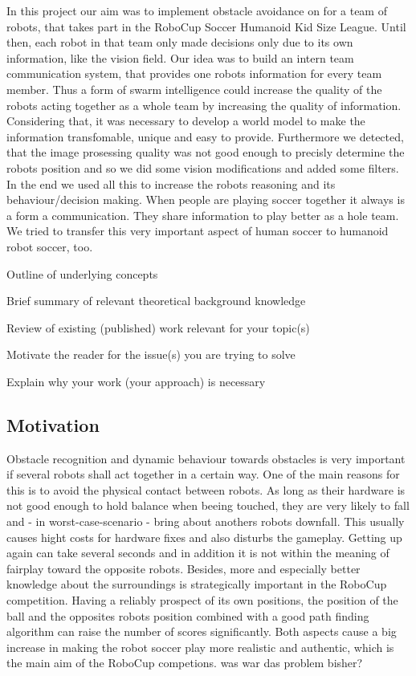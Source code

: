 \documentclass[lnicst,a4paper]{svmultln}
\begin{document}
 
In this project our aim was to implement obstacle avoidance on for a team of robots, that takes part in the RoboCup Soccer Humanoid Kid Size League. Until then, each robot in that team only made decisions only due to its own information, like the vision field. Our idea was to build an intern team communication system, that provides one robots information for every team member. Thus a form of swarm intelligence could increase the quality of the robots acting together as a whole team by increasing the quality of information. Considering that, it was necessary to develop a world model to make the information transfomable, unique and easy to provide. Furthermore we detected, that the image prosessing quality was not good enough to precisly determine the robots position and so we did some vision modifications and added some filters. In the end we used all this to increase the robots reasoning and its behaviour/decision making. When people are playing soccer together it always is a form a communication. They share information to play better as a hole team. We tried to transfer this very important aspect of human soccer to humanoid robot soccer, too.


Outline of underlying concepts

Brief summary of relevant theoretical background knowledge

Review of existing (published) work relevant for your topic(s)

Motivate the reader for the issue(s) you are trying to solve

Explain why your work (your approach) is necessary





\subsection{Motivation}
Obstacle recognition and dynamic behaviour towards obstacles is very important if several robots shall act together in a certain way. One of the main reasons for this is to avoid the physical contact between robots. As long as their hardware is not good enough to hold balance when beeing touched, they are very likely to fall and - in worst-case-scenario - bring about anothers robots downfall. This usually causes hight costs for hardware fixes and also disturbs the gameplay. Getting up again can take several seconds and in addition it is not within the meaning of fairplay toward the opposite robots. 
Besides, more and especially better knowledge about the surroundings is strategically important in the RoboCup competition. Having a reliably prospect of its own positions, the position of the ball and the opposites robots position combined with a good path finding algorithm can raise the number of scores significantly.
Both aspects cause a big increase in making the robot soccer play more realistic and authentic, which is the main aim of the RoboCup competions.
  was war das problem bisher?
\end{document}
